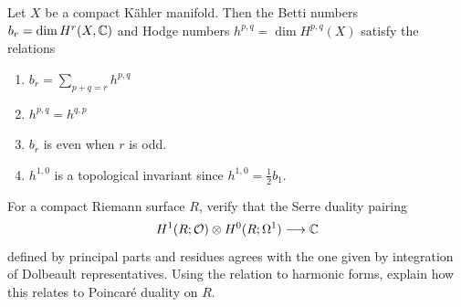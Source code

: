 \documentclass[12pt]{article}
\begin{document}
\begin{corollary} Let $X$ be a compact K\"ahler manifold. Then the Betti numbers $b_r = \dim H^r(X,\mathbb{C})$ and Hodge numbers $h^{p,q} = \dim H^{p,q}(X)$ satisfy the relations
    \begin{enumerate}
        \item $b_r = \sum_{p+q=r} h^{p,q}$
        \item $h^{p,q} = h^{q,p}$
        \item $b_r$ is even when $r$ is odd.
        \item $h^{1,0}$ is a topological invariant since $h^{1,0} = \frac{1}{2} b_1$.
    \end{enumerate}
\end{corollary}


\begin{exercise}
For a compact Riemann surface $R$, verify that the Serre duality pairing
\[
H^1(R;{\mathcal{O}})\otimes H^0(R;\Omega^1)\longrightarrow \mathbb{C}
\]
defined by principal parts and residues agrees with the one given by integration
of Dolbeault representatives. Using the relation to harmonic forms, explain how this relates to
Poincar\'e duality on $R$.
\end{exercise}
\end{document}
